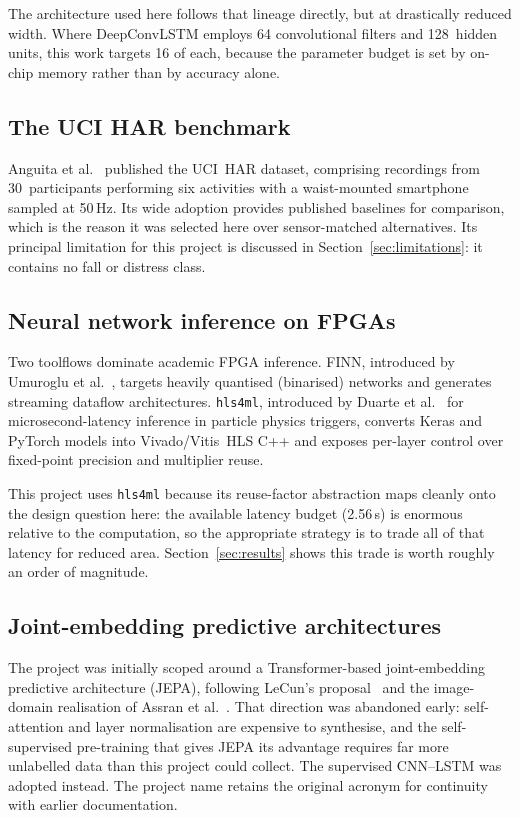 \documentclass[11pt,a4paper]{article}
\begin{document}
The architecture used here follows that lineage directly, but at drastically
reduced width. Where DeepConvLSTM employs 64 convolutional filters and
128~hidden units, this work targets 16 of each, because the parameter budget is
set by on-chip memory rather than by accuracy alone.

\subsection{The UCI HAR benchmark}

Anguita et al.~\cite{anguita2013} published the UCI~HAR dataset, comprising
recordings from 30~participants performing six activities with a waist-mounted
smartphone sampled at 50\,Hz. Its wide adoption provides published baselines for
comparison, which is the reason it was selected here over sensor-matched
alternatives. Its principal limitation for this project is discussed in
Section~\ref{sec:limitations}: it contains no fall or distress class.

\subsection{Neural network inference on FPGAs}

Two toolflows dominate academic FPGA inference. FINN, introduced by Umuroglu et
al.~\cite{umuroglu2017}, targets heavily quantised (binarised) networks and
generates streaming dataflow architectures. \texttt{hls4ml}, introduced by
Duarte et al.~\cite{duarte2018} for microsecond-latency inference in particle
physics triggers, converts Keras and PyTorch models into Vivado/Vitis~HLS C++
and exposes per-layer control over fixed-point precision and multiplier reuse.

This project uses \texttt{hls4ml} because its reuse-factor abstraction maps
cleanly onto the design question here: the available latency budget (2.56\,s) is
enormous relative to the computation, so the appropriate strategy is to trade
all of that latency for reduced area. Section~\ref{sec:results} shows this
trade is worth roughly an order of magnitude.

\subsection{Joint-embedding predictive architectures}

The project was initially scoped around a Transformer-based joint-embedding
predictive architecture (JEPA), following LeCun's
proposal~\cite{lecun2022} and the image-domain realisation of Assran et
al.~\cite{assran2023}. That direction was abandoned early: self-attention and
layer normalisation are expensive to synthesise, and the self-supervised
pre-training that gives JEPA its advantage requires far more unlabelled data
than this project could collect. The supervised CNN--LSTM was adopted instead.
The project name retains the original acronym for continuity with earlier
documentation.
\end{document}
